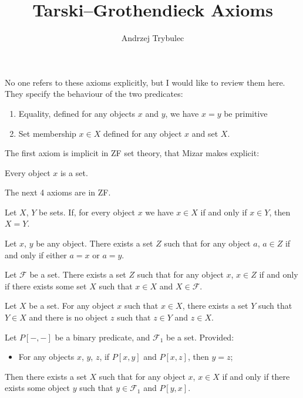 \documentclass{article}
\title{Tarski--Grothendieck Axioms}
\author{Andrzej Trybulec}
\begin{document}
\maketitle
No one refers to these axioms explicitly, but I would like to review
them here. They specify the behaviour of the two predicates:
\begin{enumerate}
\item Equality, defined for any objects $x$ and $y$, we have $x=y$ be primitive
\item Set membership $x\in X$ defined for any object $x$ and set $X$.
\end{enumerate}
The first axiom is implicit in ZF set theory, that Mizar makes
explicit: 

\begin{axiom}
Every object $x$ is a set.
\end{axiom}

\noindent The next 4 axioms are in ZF.

\begin{axiom}[Extensionality]
Let $X$, $Y$ be sets.
If, for every object $x$ we have $x\in X$ if and only if $x\in Y$,
then $X=Y$.
\end{axiom}

\begin{axiom}[Pair]
Let $x$, $y$ be any object.
There exists a set $Z$ such that for any object $a$,
$a\in Z$ if and only if either $a=x$ or $a=y$.
\end{axiom}

\begin{axiom}[Union]
Let $\mathcal{F}$ be a set.
There exists a set $Z$ such that for any object $x$,
$x\in Z$ if and only if there exists some set $X$ such that $x\in X$ and $X\in\mathcal{F}$.
\end{axiom}


\begin{axiom}[Regularity]
Let $X$ be a set. For any object $x$ such that $x\in X$,
there exists a set $Y$ such that $Y\in X$ and there is no object $z$
such that $z\in Y$ and $z\in X$.
\end{axiom}

\begin{axiom}
Let $P[-,-]$ be a binary predicate, and $\mathcal{F}_{1}$ be a set.
Provided:
\begin{itemize}
\item For any objects $x$, $y$, $z$, if $P[x,y]$ and $P[x,z]$, then $y=z$;
\end{itemize}
Then there exists a set $X$ such that for any object $x$, $x\in X$ if
and only if there exists some object $y$ such that $y\in\mathcal{F}_{1}$
and $P[y,x]$.
\end{axiom}
\end{document}

